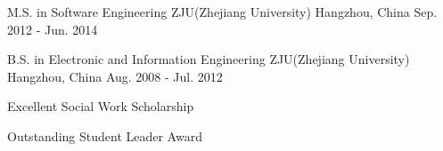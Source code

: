 

\begin{cventries}

  \cventry
    {M.S. in Software Engineering}
    {ZJU(Zhejiang University)} %
    {Hangzhou, China} %
    {Sep. 2012 - Jun. 2014} %
    {
    }

  \cventry
    {B.S. in Electronic and Information Engineering} %
    {ZJU(Zhejiang University)} %
    {Hangzhou, China} %
    {Aug. 2008 - Jul. 2012} %
    {
      \begin{cvitems} %
        \item {Excellent Social Work Scholarship}
        \item {Outstanding Student Leader Award}
      \end{cvitems}
    }

\end{cventries}
